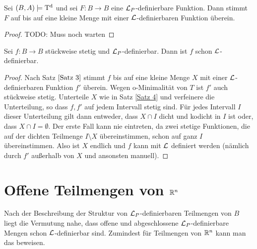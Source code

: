 \begin{theorem}\label{Satz 3}
	Sei $(B,A)\models\operatorname{T^d}$ und sei $F:B\rightarrow B$ eine $\mathcal{L}_P$-definierbare Funktion. Dann stimmt $F$ auf bis auf eine kleine Menge mit einer $\mathcal{L}$-definierbaren Funktion überein.
\end{theorem}
\begin{proof}
	TODO: Muss noch warten
\end{proof}

\begin{lemma}\label{Stückweise stetige Abbildungen}
	Sei $f:B\rightarrow B$ stückweise stetig und $\mathcal{L}_P$-definierbar. Dann ist $f$ schon $\mathcal{L}$-definierbar.
\end{lemma}
\begin{proof}
	Nach Satz $\ref{Satz 3}$ stimmt $f$ bis auf eine kleine Menge $X$ mit einer $\mathcal{L}$-definierbaren Funktion $f'$ überein. Wegen o-Minimalität von $T$ ist $f'$ auch stückweise stetig. Unterteile $X$ wie in Satz \ref{Satz 4} und verfeinere die Unterteilung, so dass $f,f'$ auf jedem Intervall stetig sind. Für jedes Intervall $I$ dieser Unterteilung gilt dann entweder, dass $X\cap I$ dicht und kodicht in $I$ ist oder, dass $X\cap I=\emptyset$. Der erste Fall kann nie eintreten, da zwei stetige Funktionen, die auf der dichten Teilmenge $I\setminus X$ übereinstimmen, schon auf ganz $I$ übereinstimmen. Also ist $X$ endlich und $f$ kann mit $\mathcal{L}$ definiert werden (nämlich durch $f'$ außerhalb von $X$ und ansonsten manuell).
\end{proof}

\section{Offene Teilmengen von $\mathbb{R}^n$}
Nach der Beschreibung der Struktur von $\mathcal{L}_P$-definierbaren Teilmengen von $B$ liegt die Vermutung nahe, dass offene und abgeschlossene $\mathcal{L}_P$-definierbare Mengen schon $\mathcal{L}$-definierbar sind. Zumindest für Teilmengen von $\mathbb{R}^n$ kann man das beweisen.

